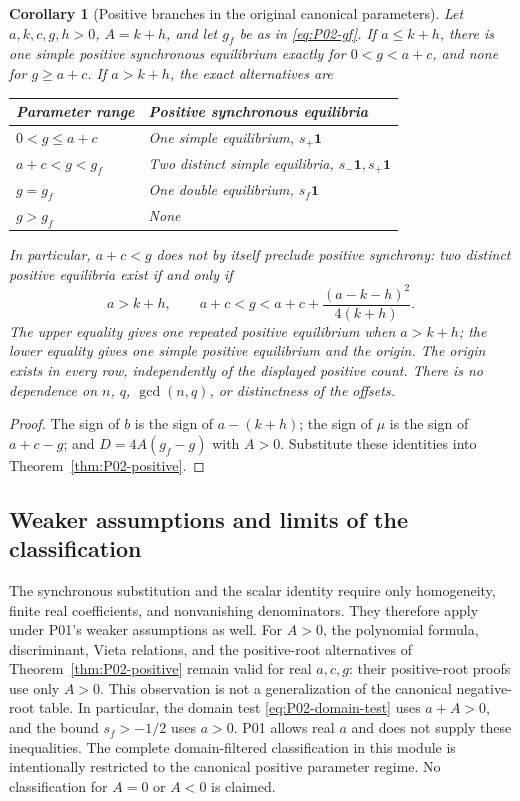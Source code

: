 \documentclass[11pt]{article}
\newcommand{\one}{\mathbf{1}}
\newtheorem{corollary}[theorem]{Corollary}
\theoremstyle{definition}
\theoremstyle{remark}
\begin{document}
\begin{corollary}[Positive branches in the original canonical parameters]
\label{cor:P02-canonical}
Let $a,k,c,g,h>0$, $A=k+h$, and let $g_f$ be as in
\eqref{eq:P02-gf}. If $a\le k+h$, there is one simple positive
synchronous equilibrium exactly for $0<g<a+c$, and none for
$g\ge a+c$. If $a>k+h$, the exact alternatives are
\begin{center}
\begin{tabular}{@{}ll@{}}
\toprule
Parameter range & Positive synchronous equilibria\\
\midrule
$0<g\le a+c$ & One simple equilibrium, $s_+\one$\\
$a+c<g<g_f$ & Two distinct simple equilibria, $s_-\one,s_+\one$\\
$g=g_f$ & One double equilibrium, $s_f\one$\\
$g>g_f$ & None\\
\bottomrule
\end{tabular}
\end{center}
In particular, $a+c<g$ does not by itself preclude positive
synchrony: two distinct positive equilibria exist if and only if
\begin{equation}
\label{eq:P02-two-positive-original}
 a>k+h,\qquad
 a+c<g<a+c+\frac{(a-k-h)^2}{4(k+h)}.
\end{equation}
The upper equality gives one repeated positive equilibrium when
$a>k+h$; the lower equality gives one simple positive equilibrium
and the origin. The origin exists in every row, independently of
the displayed positive count. There is no dependence on $n$, $q$,
$\gcd(n,q)$, or distinctness of the offsets.
\end{corollary}

\begin{proof}
The sign of $b$ is the sign of $a-(k+h)$; the sign of $\mu$ is
the sign of $a+c-g$; and $D=4A(g_f-g)$ with $A>0$.
Substitute these identities into Theorem~\ref{thm:P02-positive}.
\end{proof}

\subsection{Weaker assumptions and limits of the classification}
The synchronous substitution and the scalar identity require only
homogeneity, finite real coefficients, and nonvanishing denominators.
They therefore apply under P01's weaker assumptions as well.
For $A>0$, the polynomial formula, discriminant, Vieta relations,
and the positive-root alternatives of Theorem~\ref{thm:P02-positive}
remain valid for real $a,c,g$: their positive-root proofs use only
$A>0$. This observation is not a generalization of the canonical
negative-root table. In particular, the domain test
\eqref{eq:P02-domain-test} uses $a+A>0$, and the bound $s_f>-1/2$
uses $a>0$. P01 allows real $a$ and does not supply these inequalities.
The complete domain-filtered classification in this module is
intentionally restricted to the canonical positive parameter regime.
No classification for $A=0$ or $A<0$ is claimed.
\end{document}
